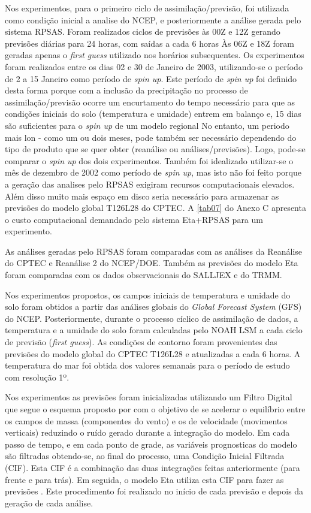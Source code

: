 Nos experimentos, para o primeiro ciclo de assimilação/previsão, foi utilizada como condição inicial a analise do NCEP, e posteriormente a análise gerada pelo sistema RPSAS. Foram realizados ciclos de previsões às 00Z e 12Z gerando previsões diárias para 24 horas, com saídas a cada 6 horas Às 06Z e 18Z foram geradas apenas o \textit{first guess} utilizado nos horários subsequentes. Os experimentos foram realizados entre os dias 02 e 30 de Janeiro de 2003, utilizando-se o período de 2 a 15 Janeiro como período de \textit{spin up}. Este período de \textit{spin up} foi definido desta forma porque com a inclusão da precipitação no processo de assimilação/previsão ocorre um encurtamento do tempo necessário para que as condições iniciais do solo (temperatura e umidade) entrem em balanço e, 15 dias são suficientes para o \textit{spin up} de um modelo regional No entanto, um periodo mais lon - como um ou dois meses, pode também ser necessário dependendo do tipo de produto que se quer obter (reanálise ou análises/previsões). Logo, pode-se comparar o \textit{spin up} dos dois experimentos. Também foi idealizado utilizar-se o mês de dezembro de 2002 como período de \textit{spin up}, mas isto não foi feito porque a geração das analises pelo RPSAS exigiram recursos computacionais elevados.  Além disso muito mais espaço em disco seria necessário para armazenar as previsões do modelo global T126L28 do CPTEC. A \autoref{tab07} do Anexo C apresenta o custo computacional demandado pelo sistema Eta+RPSAS para um experimento.

As análises geradas pelo RPSAS foram comparadas com as análises da Reanálise do CPTEC e Reanálise 2 do NCEP/DOE. Também as previsões do modelo Eta foram comparadas com os dados observacionais do SALLJEX e do TRMM.

Nos experimentos propostos, os campos iniciais de temperatura e umidade do solo foram obtidos a partir das análises globais do \textit{Global Forecast System} (GFS) do NCEP. Posteriormente, durante o processo cíclico de assimilação de dados, a temperatura e a umidade do solo foram calculadas pelo NOAH LSM a cada ciclo de previsão (\textit{first guess}). As condições de contorno foram provenientes das previsões do modelo global do CPTEC T126L28 e atualizadas a cada 6 horas. A temperatura do mar foi obtida dos valores semanais para o período de estudo com resolução 1º.

Nos experimentos as previsões foram inicializadas utilizando um Filtro Digital que segue o esquema proposto por  com o objetivo de se acelerar o equilíbrio entre os campos de massa (componentes do vento) e os de velocidade (movimentos verticais) reduzindo o ruído gerado durante a integração do modelo. Em cada passo de tempo, e em cada ponto de grade, as variáveis prognosticas do modelo são filtradas obtendo-se, ao final do processo, uma Condição Inicial Filtrada (CIF). Esta CIF é a combinação das duas integrações feitas anteriormente (para frente e para trás). Em seguida, o modelo Eta utiliza esta CIF para fazer as previsões \cite{harter99}. Este procedimento foi realizado no início de cada previsão e depois da geração de cada análise. 


